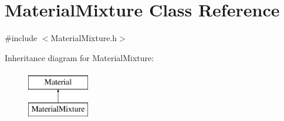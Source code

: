 \hypertarget{classMaterialMixture}{}\section{Material\+Mixture Class Reference}
\label{classMaterialMixture}


{\ttfamily \#include $<$Material\+Mixture.\+h$>$}

Inheritance diagram for Material\+Mixture\+:\begin{figure}[H]
\begin{center}
\leavevmode
\includegraphics[height=2.000000cm]{classMaterialMixture}
\end{center}
\end{figure}
